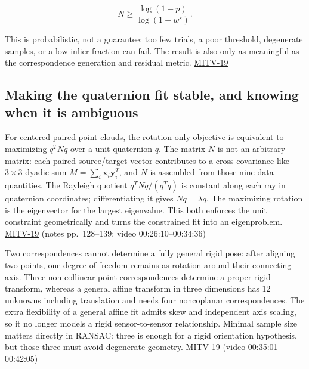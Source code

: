 \[
N\ge\frac{\log(1-p)}{\log(1-w^s)}.
\]

This is probabilistic, not a guarantee: too few trials, a poor threshold, degenerate samples, or a low inlier fraction can fail. The result is also only as meaningful as the correspondence generation and residual metric. \hyperref[04-visual-computing-ii-ch036-mitv-19---absolute-orientation-in-closed-form-outliers-and-robustness-ransac]{MITV-19}

\subsection{Making the quaternion fit stable, and knowing when it is ambiguous}\label{04-visual-computing-ii-ch032-making-the-quaternion-fit-stable-and-knowing-when-it-is-ambiguous}

For centered paired point clouds, the rotation-only objective is equivalent to maximizing \(q^TNq\) over a unit quaternion \(q\). The matrix \(N\) is not an arbitrary matrix: each paired source/target vector contributes to a cross-covariance-like \(3\times3\) dyadic sum \(M=\sum_i \mathbf{x}_i\mathbf{y}_i^T\), and \(N\) is assembled from those nine data quantities. The Rayleigh quotient \(q^TNq/(q^Tq)\) is constant along each ray in quaternion coordinates; differentiating it gives \(Nq=\lambda q\). The maximizing rotation is the eigenvector for the largest eigenvalue. This both enforces the unit constraint geometrically and turns the constrained fit into an eigenproblem. \hyperref[04-visual-computing-ii-ch036-mitv-19---absolute-orientation-in-closed-form-outliers-and-robustness-ransac]{MITV-19} (notes pp.~128--139; video 00:26:10--00:34:36)

Two correspondences cannot determine a fully general rigid pose: after aligning two points, one degree of freedom remains as rotation around their connecting axis. Three non-collinear point correspondences determine a proper rigid transform, whereas a general affine transform in three dimensions has 12 unknowns including translation and needs four noncoplanar correspondences. The extra flexibility of a general affine fit admits skew and independent axis scaling, so it no longer models a rigid sensor-to-sensor relationship. Minimal sample size matters directly in RANSAC: three is enough for a rigid orientation hypothesis, but those three must avoid degenerate geometry. \hyperref[04-visual-computing-ii-ch036-mitv-19---absolute-orientation-in-closed-form-outliers-and-robustness-ransac]{MITV-19} (video 00:35:01--00:42:05)

